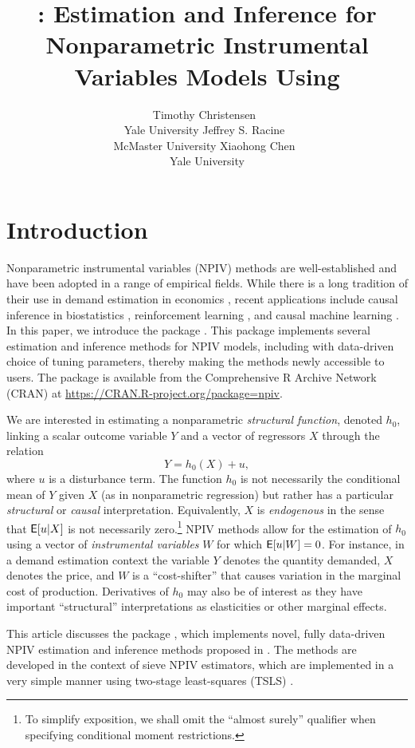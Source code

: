 \documentclass[
]{jss}
\author{
Timothy Christensen~\orcidlink{0000-0002-4639-5015}\\Yale
University \And Jeffrey S.
Racine~\orcidlink{0000-0002-5680-3705}\\McMaster
University \And Xiaohong Chen~\orcidlink{0000-0003-1125-675X}\\Yale
University
}
\title{\pkg{npiv}: Estimation and Inference for Nonparametric
Instrumental Variables Models Using \proglang{R}}
\begin{document}
\section{Introduction}\label{introduction}

Nonparametric instrumental variables (NPIV) methods are well-established
and have been adopted in a range of empirical fields. While there is a
long tradition of their use in demand estimation in economics
\citep{BCK, BHP, BerryHaile2014}, recent applications include causal
inference in biostatistics \citep{WangZhiTT2018}, reinforcement learning
\citep{grettonRL2021}, and causal machine learning \citep{causalML}. In
this paper, we introduce the  \citep{R} package 
\citep{NPIV}. This package implements several estimation and inference
methods for NPIV models, including with data-driven choice of tuning
parameters, thereby making the methods newly accessible to 
users. The package  is available from the Comprehensive R
Archive Network (CRAN) at \url{https://CRAN.R-project.org/package=npiv}.

We are interested in estimating a nonparametric \emph{structural
function}, denoted \(h_0\), linking a scalar outcome variable \(Y\) and
a vector of regressors \(X\) through the relation
\begin{equation}\label{eq:npiv}
 Y = h_0(X) + u,
\end{equation} where \(u\) is a disturbance term. The function \(h_0\)
is not necessarily the conditional mean of \(Y\) given \(X\) (as in
nonparametric regression) but rather has a particular \emph{structural}
or \emph{causal} interpretation. Equivalently, \(X\) is
\emph{endogenous} in the sense that \(\mathsf{E}[u|X]\) is not necessarily
zero.\footnote{To simplify exposition, we shall omit the ``almost
  surely'' qualifier when specifying conditional moment restrictions.}
NPIV methods allow for the estimation of \(h_0\) using a vector of
\emph{instrumental variables} \(W\) for which \(\mathsf{E}[u|W] = 0\). For
instance, in a demand estimation context the variable \(Y\) denotes the
quantity demanded, \(X\) denotes the price, and \(W\) is a
``cost-shifter'' that causes variation in the marginal cost of
production. Derivatives of \(h_0\) may also be of interest as they have
important ``structural'' interpretations as elasticities or other
marginal effects.

This article discusses the  package , which
implements novel, fully data-driven NPIV estimation and inference
methods proposed in \citet{CCK}. The methods are developed in the
context of sieve NPIV estimators, which are implemented in a very simple
manner using two-stage least-squares (TSLS) \citep{AC, NP}.
\end{document}

